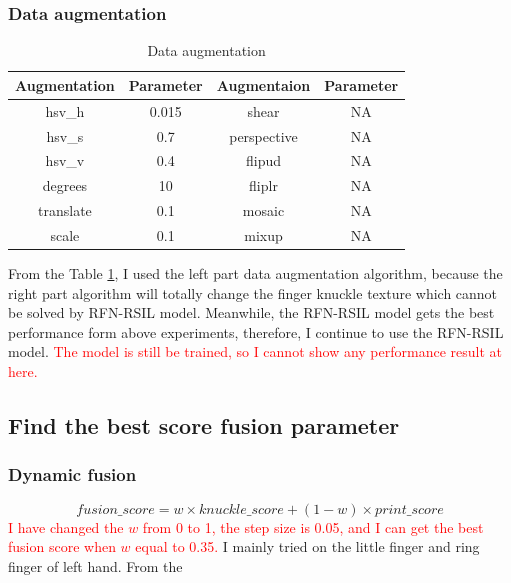 \subsubsection{Data augmentation}
\begin{table}[h]
    \centering
    \caption{Data augmentation}
    \begin{tabular}{cccc}
    \hline
    Augmentation & Parameter & Augmentaion & Parameter \\ \hline
    hsv\_h       & 0.015     & shear       & NA        \\
    hsv\_s       & 0.7       & perspective & NA        \\
    hsv\_v       & 0.4       & flipud      & NA        \\
    degrees      & 10         & fliplr      & NA        \\
    translate    & 0.1       & mosaic      & NA        \\
    scale        & 0.1       & mixup       & NA        \\ \hline
    \end{tabular}
    \label{data-augmentation}
\end{table}
From the Table \ref{data-augmentation}, I used the left part data augmentation algorithm, because the right part algorithm will totally change the finger knuckle texture which cannot be solved by RFN-RSIL model. Meanwhile, the RFN-RSIL model gets the best performance form above experiments, therefore, I continue to use the RFN-RSIL model. \textcolor{red}{The model is still be trained, so I cannot show any performance result at here.}

\subsection{Find the best score fusion parameter}
\subsubsection{Dynamic fusion}
\begin{equation}
    fusion\_score = w\times knuckle\_score + (1-w)\times print\_score
\end{equation}
\textcolor{red}{I have changed the $w$ from 0 to 1, the step size is 0.05, and I can get the best fusion score when $w$ equal to 0.35.} I mainly tried on the little finger and ring finger of left hand. From the 

